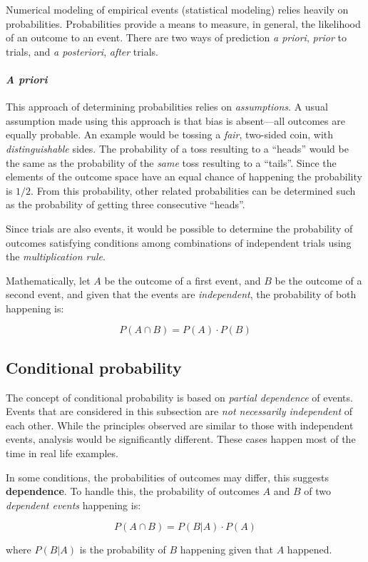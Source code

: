 Numerical modeling of empirical events (statistical modeling) relies heavily on probabilities.
Probabilities provide a means to measure, in general, the likelihood of an outcome to an event.
There are two ways of prediction \textit{a priori}, \emph{prior} to trials, and \textit{a posteriori}, \emph{after} trials.

\paragraph{\textit{A priori}}
This approach of determining probabilities relies on \emph{assumptions}.
A usual assumption made using this approach is that bias is absent---all outcomes are equally probable.
An example would be tossing a \emph{fair}, two-sided coin, with \emph{distinguishable} sides.
The probability of a toss resulting to a ``heads'' would be the same as the probability of the \emph{same} toss resulting to a ``tails''.
Since the elements of the outcome space have an equal chance of happening the probability is $1/2$.
From this probability, other related probabilities can be determined such as the probability of getting three consecutive ``heads''.

Since trials are also events, it would be possible to determine the probability of outcomes satisfying conditions among combinations of independent trials using the \emph{multiplication rule}.

Mathematically, let $A$ be the outcome of a first event, and $B$ be the outcome of a second event, and given that the events are \emph{independent}, the probability of both happening is:

$$P(A \cap B) = P(A) \cdot P(B)$$

\subsection{Conditional probability}

The concept of conditional probability is based on \emph{partial dependence} of events.
Events that are considered in this subsection are \emph{not necessarily independent} of each other.
While the principles observed are similar to those with independent events, analysis would be significantly different.
These cases happen most of the time in real life examples.

In some conditions, the probabilities of outcomes may differ, this suggests \textbf{dependence}.
To handle this, the probability of outcomes $A$ and $B$ of two \emph{dependent events} happening is:

$$P(A \cap B) = P(B|A) \cdot P(A)$$

where $P(B|A)$ is the probability of $B$ happening given that $A$ happened.
